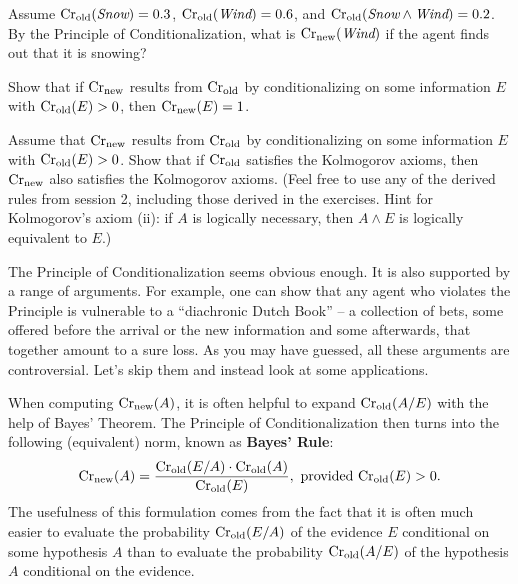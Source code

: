 \begin{exercise}
  Assume $\text{Cr$_{\text{old}}$}(\emph{Snow}) = 0.3$, $\text{Cr$_{\text{old}}$}(\emph{Wind}) = 0.6$, and
  $\text{Cr$_{\text{old}}$}(\emph{Snow} \land \emph{Wind}) = 0.2$. By the Principle of
  Conditionalization, what is $\text{Cr$_{\text{new}}$}(\emph{Wind})$ if the agent finds
  out that it is snowing?
\end{exercise}


\begin{exercise}
  Show that if $\text{Cr$_{\text{new}}$}$ results from $\text{Cr$_{\text{old}}$}$ by conditionalizing on
  some information $E$ with $\text{Cr$_{\text{old}}$}(E) > 0$, then $\text{Cr$_{\text{new}}$}(E) = 1$.
\end{exercise}



  

\begin{exercise}
  Assume that $\text{Cr$_{\text{new}}$}$ results from $\text{Cr$_{\text{old}}$}$ by conditionalizing on some
  information $E$ with $\text{Cr$_{\text{old}}$}(E) > 0$. Show that if $\text{Cr$_{\text{old}}$}$ satisfies
  the Kolmogorov axioms, then $\text{Cr$_{\text{new}}$}$ also satisfies the Kolmogorov
  axioms. (Feel free to use any of the derived rules from session 2,
  including those derived in the exercises. Hint for Kolmogorov's
  axiom (ii): if $A$ is logically necessary, then $A\land E$ is
  logically equivalent to $E$.)
\end{exercise}


The Principle of Conditionalization seems obvious enough. It is also
supported by a range of arguments. For example, one can show that any
agent who violates the Principle is vulnerable to a ``diachronic Dutch
Book'' -- a collection of bets, some offered before the arrival or the
new information and some afterwards, that together amount to a sure
loss. As you may have guessed, all these arguments are
controversial. Let's skip them and instead look at some applications.

When computing $\text{Cr}_\text{new}(A)$, it is often helpful to expand
$\text{Cr}_\text{old}(A/E)$ with the help of Bayes' Theorem. The Principle
of Conditionalization then turns into the following (equivalent) norm,
known as \textbf{Bayes' Rule}:
%
\[
\text{Cr}_{\text{new}}(A) = \frac{\text{Cr}_{\text{old}}(E/A) \cdot \text{Cr}_{\text{old}}(A)}{\text{Cr}_{\text{old}}(E)}, \text{ provided $\text{Cr}_\text{old}(E) > 0$}.
\]
%
The usefulness of this formulation comes from the fact that it is
often much easier to evaluate the probability $\text{Cr$_{\text{old}}$}(E/A)$ of the
evidence $E$ conditional on some hypothesis $A$  than to
evaluate the probability $\text{Cr$_{\text{old}}$}(A/E)$ of the hypothesis $A$ conditional
on the evidence.

